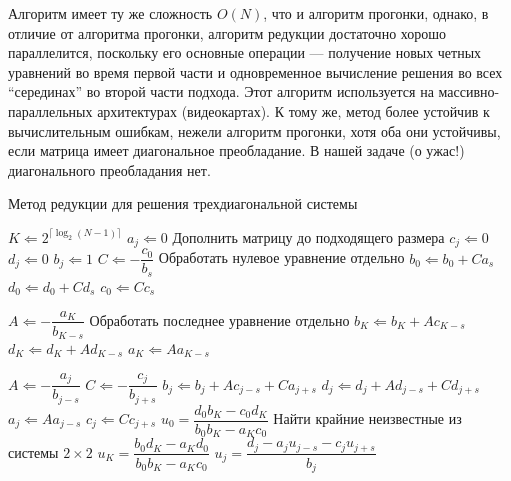 \documentclass[12pt]{article}
\begin{document}
Алгоритм имеет ту же сложность $O(N)$, что и алгоритм прогонки, однако, в отличие
от алгоритма прогонки, алгоритм редукции достаточно хорошо параллелится,
поскольку его основные операции --- получение новых четных уравнений во время первой части и
одновременное вычисление решения во всех ``серединах'' во второй части подхода. Этот алгоритм используется
на массивно-параллельных архитектурах (видеокартах). К тому же, метод более
устойчив к вычислительным ошибкам, нежели алгоритм прогонки, хотя оба они
устойчивы, если матрица имеет диагональное преобладание. В нашей задаче (о ужас!)
диагонального преобладания нет.

\begin{algorithm}
\caption{Метод редукции для решения трехдиагональной системы}
\label{alg:reduct}
\begin{algorithmic}[1]
\State $K \Leftarrow 2^{\lceil \log_2 (N-1) \rceil}$
	\State $a_j \Leftarrow 0$ \Comment Дополнить матрицу до подходящего размера
	\State $c_j \Leftarrow 0$
	\State $d_j \Leftarrow 0$
	\State $b_j \Leftarrow 1$
\EndFor
{}
	\State $C \Leftarrow -\dfrac{c_0}{b_s}$
	\Comment Обработать нулевое уравнение отдельно
	\State $b_0 \Leftarrow b_0 + C a_s$
	\State $d_0 \Leftarrow d_0 + C d_s$
	\State $c_0 \Leftarrow C c_s$

	\State $A \Leftarrow -\dfrac{a_K}{b_{K-s}}$
	\Comment Обработать последнее уравнение отдельно
	\State $b_K \Leftarrow b_K + A c_{K-s}$
	\State $d_K \Leftarrow d_K + A d_{K-s}$
	\State $a_K \Leftarrow A a_{K-s}$

		\State $A \Leftarrow -\dfrac{a_j}{b_{j-s}}$
		\State $C \Leftarrow -\dfrac{c_j}{b_{j+s}}$
		\State $b_j \Leftarrow b_j + A c_{j - s} + C a_{j + s}$ 
		\State $d_j \Leftarrow d_j + A d_{j - s} + C d_{j + s}$
		\State $a_j \Leftarrow A a_{j-s}$
		\State $c_j \Leftarrow C c_{j+s}$
	\EndFor
\EndFor
\State $u_0 = \dfrac{d_0 b_K - c_0 d_K}{b_0 b_K - a_K c_0}$
\Comment Найти крайние неизвестные из системы $2 \times 2$
\State $u_K = \dfrac{b_0 d_K - a_K d_0}{b_0 b_K - a_K c_0}$
		\State $u_j = \dfrac{d_j - a_j u_{j-s} - c_j u_{j+s}}{b_j}$
	\EndFor
\EndFor
\end{algorithmic}
\end{algorithm}
\end{document}
